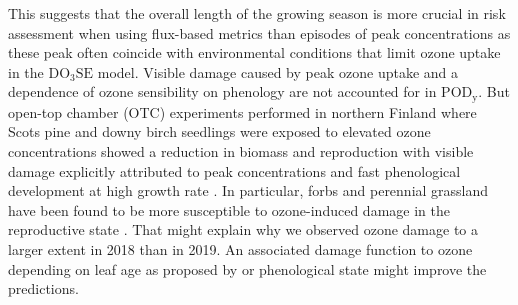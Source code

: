 \documentclass[bg, manuscript]{copernicus}
\begin{document}
This suggests that the overall length of the growing season is more crucial in risk assessment when using flux-based metrics than episodes of peak concentrations as these peak \chem{[O_3]} often coincide with environmental conditions that limit ozone uptake in the $\mathrm{DO_3SE}$ model. Visible damage caused by peak ozone uptake and a dependence of ozone sensibility on phenology are not accounted for in $\mathrm{POD_y}$. But open-top chamber (OTC) experiments performed in northern Finland where Scots pine and downy birch seedlings were exposed to elevated ozone concentrations showed a reduction in biomass and reproduction with visible damage explicitly attributed to peak  concentrations and fast phenological development at high growth rate \citep{Amb:Manninen2009}. In particular, forbs and perennial grassland have been found to be more susceptible to ozone-induced damage in the reproductive state \citep{EP:Bassin2004}. That might explain why we observed ozone damage to a larger extent in 2018 than in 2019. An associated damage function to ozone depending on leaf age as proposed by \citet{AE:Musselman2006} or phenological state might improve the predictions.
\end{document}
